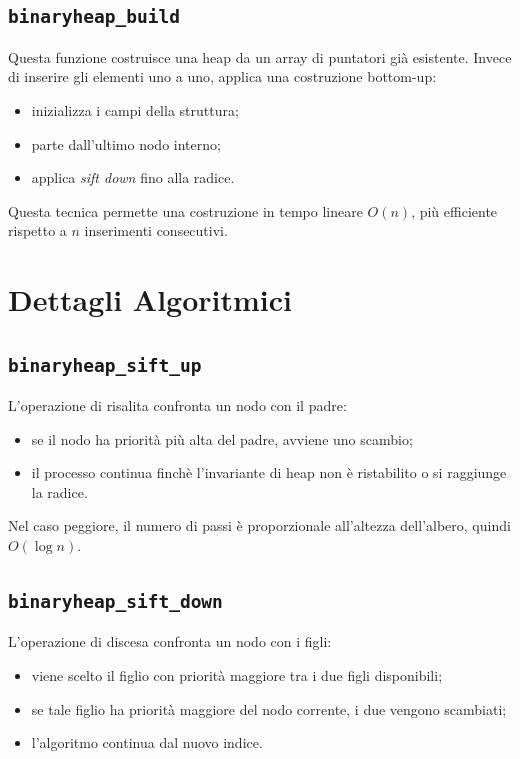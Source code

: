 \documentclass[a4paper,12pt]{article}
\begin{document}
\subsection{\texttt{binaryheap\_build}}

Questa funzione costruisce una heap da un array di puntatori già esistente. Invece di inserire gli elementi uno a uno, applica una costruzione bottom-up:

\begin{itemize}[leftmargin=*]
    \item inizializza i campi della struttura;
    \item parte dall'ultimo nodo interno;
    \item applica \emph{sift down} fino alla radice.
\end{itemize}

Questa tecnica permette una costruzione in tempo lineare \(O(n)\), più efficiente rispetto a \(n\) inserimenti consecutivi.

\section{Dettagli Algoritmici}

\subsection{\texttt{binaryheap\_sift\_up}}

L'operazione di risalita confronta un nodo con il padre:

\begin{itemize}[leftmargin=*]
    \item se il nodo ha priorità più alta del padre, avviene uno scambio;
    \item il processo continua finchè l'invariante di heap non è ristabilito o si raggiunge la radice.
\end{itemize}

Nel caso peggiore, il numero di passi è proporzionale all'altezza dell'albero, quindi \(O(\log n)\).

\subsection{\texttt{binaryheap\_sift\_down}}

L'operazione di discesa confronta un nodo con i figli:

\begin{itemize}[leftmargin=*]
    \item viene scelto il figlio con priorità maggiore tra i due figli disponibili;
    \item se tale figlio ha priorità maggiore del nodo corrente, i due vengono scambiati;
    \item l'algoritmo continua dal nuovo indice.
\end{itemize}
\end{document}
